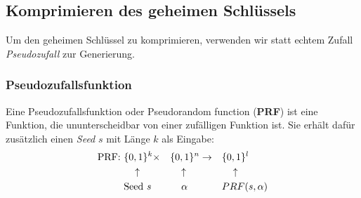 \documentclass[12pt,A4]{extarticle}
\begin{document}
\subsection{Komprimieren des geheimen Schlüssels}
Um den geheimen Schlüssel zu komprimieren, verwenden wir statt echtem Zufall \textit{Pseudozufall} zur Generierung.
\subsubsection{Pseudozufallsfunktion}
Eine Pseudozufallsfunktion oder Pseudorandom function (\textbf{PRF}) ist eine Funktion, die ununterscheidbar von einer zufälligen Funktion ist. Sie erhält dafür zusätzlich einen \textit{Seed} $s$ mit Länge $k$ als Eingabe:
\begin{alignat*}{5}
  \text{PRF: } & \{0,1\}^k \times        &  & \{0,1\}^n \rightarrow  &  & \{0,1\}^l               \\
               & \hspace{0.3cm} \uparrow &  & \hspace{0.3cm}\uparrow &  & \hspace{0.3cm} \uparrow \\
               & \text{Seed } s          &  & \hspace{0.4cm}\alpha   &  & PRF(s, \alpha)
\end{alignat*}
\end{document}

